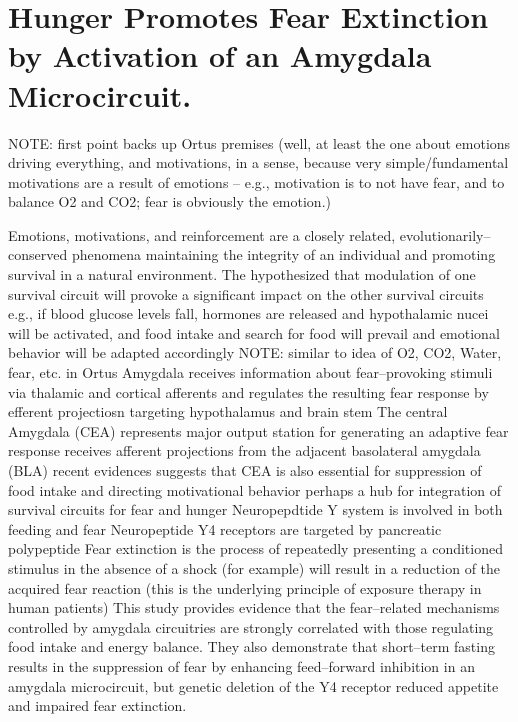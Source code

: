 \documentclass[11pt, a4paper, oneside]{article}   	%
\begin{document}
\section{Hunger Promotes Fear Extinction by Activation of an Amygdala Microcircuit. \cite{Verma2015}}

NOTE: first point backs up Ortus premises (well, at least the one about emotions driving everything, and motivations, in a sense, because very simple/fundamental motivations are a result of emotions -- e.g., motivation is to not have fear, and to balance O2 and CO2; fear is obviously the emotion.)


\begin{outline}
   \point Emotions, motivations, and reinforcement are a closely related, evolutionarily--conserved phenomena maintaining the integrity of an individual and promoting survival in a natural environment. 
   \point The hypothesized that modulation of one survival circuit will provoke a significant impact on the other survival circuits
        \subpoint e.g., if blood glucose levels fall, hormones are released and hypothalamic nucei will be activated, and food intake and search for food will prevail and emotional behavior will be adapted accordingly
            \subsubpoint NOTE: similar to idea of O2, CO2, Water, fear, etc. in Ortus
    \point Amygdala receives information about fear--provoking stimuli via thalamic and cortical afferents and regulates the resulting fear response by efferent projectiosn targeting hypothalamus and brain stem
    \point The central Amygdala (CEA) represents major output station for generating an adaptive fear response
        \subpoint receives afferent projections from the adjacent basolateral amygdala (BLA)
        \subpoint recent evidences suggests that CEA is also essential for suppression of food intake and directing motivational behavior
            \subsubpoint perhaps a hub for integration of survival circuits for fear and hunger
    \point Neuropepdtide Y system is involved in both feeding and fear
        \subpoint Neuropeptide Y4 receptors  are targeted by pancreatic polypeptide
    \point Fear extinction is the process of repeatedly presenting a conditioned stimulus in the absence of a shock (for example) will result in a reduction of the acquired fear reaction (this is the underlying principle of exposure therapy in human patients)
    \point This study provides evidence that the fear--related mechanisms controlled by amygdala circuitries are strongly correlated with those regulating food intake and energy balance.  They also demonstrate that short--term fasting results in the suppression of fear by enhancing feed--forward inhibition in an amygdala microcircuit, but genetic deletion of the Y4 receptor reduced appetite and impaired fear extinction.

\end{outline}
\end{document}
